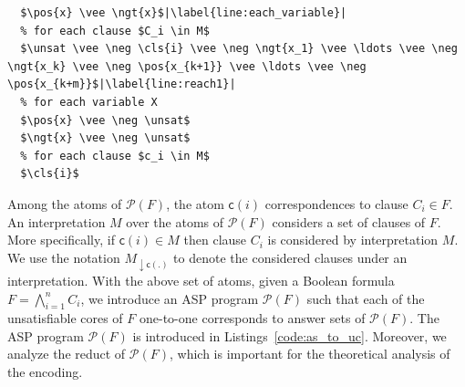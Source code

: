 \documentclass{article}
\newcommand{\unsat}{\ensuremath{\mathsf{unsat}}}
\newcommand{\pos}[1]{\ensuremath{\mathsf{pos}(#1)}}
\newcommand{\ngt}[1]{\ensuremath{\mathsf{neg}(#1)}}
\newcommand{\cls}[1]{\ensuremath{\mathsf{c}(#1)}}
\newcommand{\program}[1]{\mathcal{P}(#1)}
\begin{document}
\begin{lstlisting}[caption={Reduct of $\program{F}$ w.r.t. $M$},label={code:program_to_reduct},captionpos=b,mathescape=true,escapechar=|,float]
  % for each variable $x \in X$
  $\pos{x} \vee \ngt{x}$|\label{line:each_variable}|
  % for each clause $C_i \in M$
  $\unsat \vee \neg \cls{i} \vee \neg \ngt{x_1} \vee \ldots \vee \neg \ngt{x_k} \vee \neg \pos{x_{k+1}} \vee \ldots \vee \neg \pos{x_{k+m}}$|\label{line:reach1}|
  % for each variable X
  $\pos{x} \vee \neg \unsat$
  $\ngt{x} \vee \neg \unsat$
  % for each clause $c_i \in M$
  $\cls{i}$
\end{lstlisting}
Among the atoms of $\program{F}$, the atom $\cls{i}$ correspondences to clause $C_i \in F$. 
An interpretation $M$ over the atoms of $\program{F}$ considers a set of clauses of $F$.
More specifically, if $\cls{i} \in M$ then clause $C_i$ is considered by interpretation $M$.
We use the notation $M_{\downarrow \cls{.}}$ to denote the considered clauses under an interpretation. 
With the above set of atoms, given a Boolean formula $F = \bigwedge_{i=1}^{n} C_i$, we introduce an ASP program $\program{F}$ such that each of the unsatisfiable cores of $F$ one-to-one corresponds to answer sets of $\program{F}$. 
The ASP program $\program{F}$ is introduced in Listings~\ref{code:as_to_uc}. 
Moreover, we analyze the reduct of $\program{F}$, which is important for the theoretical analysis of the encoding. 
\end{document}

